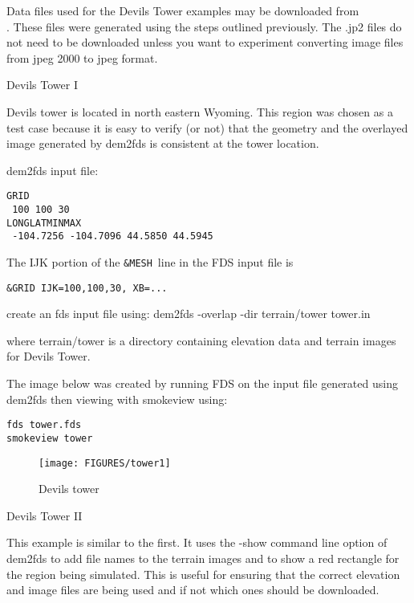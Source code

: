 
Data files used for the Devils Tower examples may be downloaded from \\
.
These files were generated using the steps outlined previously. 
The .jp2 files do not need to be downloaded unless you want to experiment converting image files from jpeg 2000 to jpeg format.

Devils Tower I

Devils tower is located in north eastern Wyoming.
This region was chosen as a test case because it is easy to verify (or not) that the geometry and the 
overlayed image generated by dem2fds is consistent at the tower location.

dem2fds input file:
\begin{verbatim}
GRID
 100 100 30
LONGLATMINMAX
 -104.7256 -104.7096 44.5850 44.5945
\end{verbatim}

The IJK portion of the {\tt \&MESH}\ line in the FDS input file is

\begin{verbatim}
&GRID IJK=100,100,30, XB=...
\end{verbatim}

create an fds input file using:
dem2fds -overlap -dir terrain/tower tower.in

where terrain/tower is a directory containing elevation data and terrain images for Devils Tower.

The image below was created by running FDS on the input file generated using dem2fds then viewing with smokeview using:

\begin{verbatim}
fds tower.fds
smokeview tower
\end{verbatim}

\begin{figure}[bph]
\centerline{
\texttt{[image: FIGURES/tower1]}}
 \caption[FDS file overview]{Devils tower }
\label{develstower}%
\end{figure}


Devils Tower II

This example is similar to the first. It uses the -show command line option of dem2fds to add file names 
to the terrain images and to show a red rectangle for the region being simulated. 
This is useful for ensuring that the correct elevation and image files are being used and if not which ones should be downloaded.

